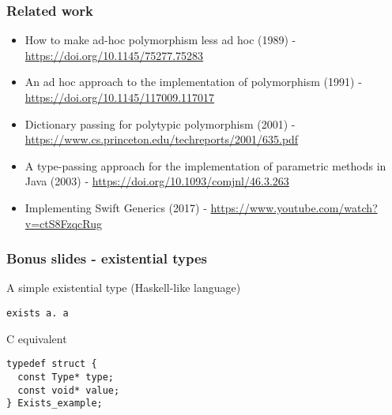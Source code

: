 \documentclass[t]{beamer}
\begin{document}
\begin{frame}[fragile]
\frametitle{Related work}

\begin{itemize}
\item How to make ad-hoc polymorphism less ad hoc (1989) - \url{https://doi.org/10.1145/75277.75283}
\item An ad hoc approach to the implementation of polymorphism (1991) - \url{https://doi.org/10.1145/117009.117017}
\item Dictionary passing for polytypic polymorphism (2001) - \url{https://www.cs.princeton.edu/techreports/2001/635.pdf}
\item A type-passing approach for the implementation of parametric methods in Java (2003) - \url{https://doi.org/10.1093/comjnl/46.3.263}
\item Implementing Swift Generics (2017) - \url{https://www.youtube.com/watch?v=ctS8FzqcRug}
\end{itemize}
\end{frame}


\begin{frame}[fragile]
\frametitle{Bonus slides - existential types}

\begin{block}{A simple existential type (Haskell-like language)}
\begin{verbatim}
exists a. a
\end{verbatim}
\end{block}

\begin{block}{C equivalent}
\begin{verbatim}
typedef struct {
  const Type* type;
  const void* value;
} Exists_example;
\end{verbatim}
\end{block}

\end{frame}
\end{document}
